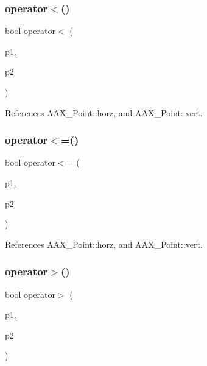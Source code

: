\subsubsection{\texorpdfstring{operator$<$()}{operator<()}}
{\footnotesize\ttfamily bool operator$<$ (\begin{DoxyParamCaption}\item[{const \mbox{\hyperlink{a01609}{A\+A\+X\+\_\+\+Point}} \&}]{p1,  }\item[{const \mbox{\hyperlink{a01609}{A\+A\+X\+\_\+\+Point}} \&}]{p2 }\end{DoxyParamCaption})\hspace{0.3cm}{\ttfamily [inline]}}



References A\+A\+X\+\_\+\+Point\+::horz, and A\+A\+X\+\_\+\+Point\+::vert.

\mbox{\label{a00503_a3e748786f6aec65c75791b067f5158d3}} 
\subsubsection{\texorpdfstring{operator$<$=()}{operator<=()}}
{\footnotesize\ttfamily bool operator$<$= (\begin{DoxyParamCaption}\item[{const \mbox{\hyperlink{a01609}{A\+A\+X\+\_\+\+Point}} \&}]{p1,  }\item[{const \mbox{\hyperlink{a01609}{A\+A\+X\+\_\+\+Point}} \&}]{p2 }\end{DoxyParamCaption})\hspace{0.3cm}{\ttfamily [inline]}}



References A\+A\+X\+\_\+\+Point\+::horz, and A\+A\+X\+\_\+\+Point\+::vert.

\mbox{\label{a00503_adc56c3178fe78676f64e658930a66afb}} 
\subsubsection{\texorpdfstring{operator$>$()}{operator>()}}
{\footnotesize\ttfamily bool operator$>$ (\begin{DoxyParamCaption}\item[{const \mbox{\hyperlink{a01609}{A\+A\+X\+\_\+\+Point}} \&}]{p1,  }\item[{const \mbox{\hyperlink{a01609}{A\+A\+X\+\_\+\+Point}} \&}]{p2 }\end{DoxyParamCaption})\hspace{0.3cm}{\ttfamily [inline]}}

